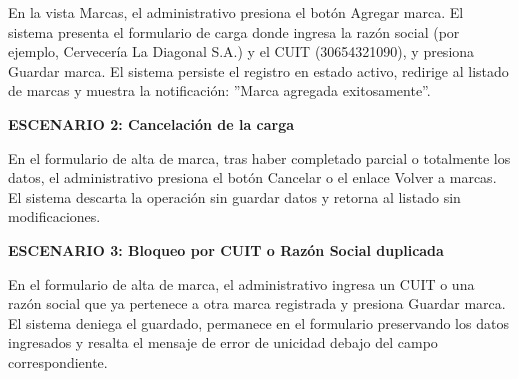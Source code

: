 \documentclass[a4paper,9pt]{article}
\begin{document}
\begin{tcolorbox}[hucard, title={\textbf{HU-252: AGREGAR MARCA PROVEEDORA} \hfill \scriptsize \colorbox{bluestatus}{\textbf{\ New\ }} \quad \colorbox{white}{\textcolor{primarydark}{\textbf{\ 0 pts\ }}}}]
{En la vista Marcas, el administrativo presiona el botón Agregar marca. El sistema presenta el formulario de carga donde ingresa la razón social (por ejemplo, Cervecería La Diagonal S.A.) y el CUIT (30654321090), y presiona Guardar marca. El sistema persiste el registro en estado activo, redirige al listado de marcas y muestra la notificación: ''Marca agregada exitosamente''.\par\vspace{2.5pt}
\noindent\textbf{\textcolor{secondarydark}{ESCENARIO 2:  Cancelación de la carga}}\par\vspace{1pt}
En el formulario de alta de marca, tras haber completado parcial o totalmente los datos, el administrativo presiona el botón Cancelar o el enlace Volver a marcas. El sistema descarta la operación sin guardar datos y retorna al listado sin modificaciones.\par\vspace{2.5pt}
\noindent\textbf{\textcolor{secondarydark}{ESCENARIO 3:  Bloqueo por CUIT o Razón Social duplicada}}\par\vspace{1pt}
En el formulario de alta de marca, el administrativo ingresa un CUIT o una razón social que ya pertenece a otra marca registrada y presiona Guardar marca. El sistema deniega el guardado, permanece en el formulario preservando los datos ingresados y resalta el mensaje de error de unicidad debajo del campo correspondiente.\par\vspace{2.5pt}
}\par
\end{tcolorbox}
\end{document}
